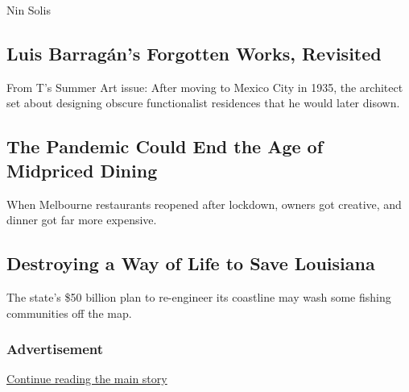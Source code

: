 \href{/2020/07/24/t-magazine/luis-barragan.html}{}

Nin Solis

\href{/2020/07/24/t-magazine/luis-barragan.html}{}

\hypertarget{luis-barraguxe1ns-forgotten-works-revisited}{%
\subsection{Luis Barragán's Forgotten Works,
Revisited}\label{luis-barraguxe1ns-forgotten-works-revisited}}

From T's Summer Art issue: After moving to Mexico City in 1935, the
architect set about designing obscure functionalist residences that he
would later disown.

\href{/2020/07/28/dining/melbourne-restaurants-coronavirus.html}{}

\hypertarget{the-pandemic-could-end-the-age-of-midpriced-dining}{%
\subsection{The Pandemic Could End the Age of Midpriced
Dining}\label{the-pandemic-could-end-the-age-of-midpriced-dining}}

When Melbourne restaurants reopened after lockdown, owners got creative,
and dinner got far more expensive.

\href{/2020/07/28/dining/melbourne-restaurants-coronavirus.html}{}

\href{/interactive/2020/07/21/magazine/louisiana-coast-engineering.html}{}

\hypertarget{destroying-a-way-of-life-to-save-louisiana}{%
\subsection{Destroying a Way of Life to Save
Louisiana}\label{destroying-a-way-of-life-to-save-louisiana}}

The state's \$50 billion plan to re-engineer its coastline may wash some
fishing communities off the map.

\href{/interactive/2020/07/21/magazine/louisiana-coast-engineering.html}{}

\hypertarget{advertisement}{%
\subsubsection{Advertisement}\label{advertisement}}

\protect\hyperlink{after-dfp-ad-mid1-large}{Continue reading the main
story}

